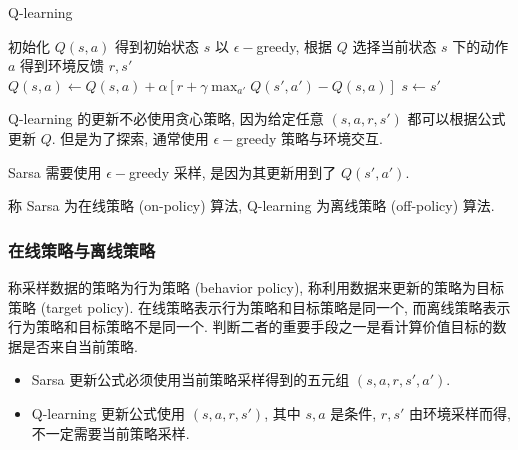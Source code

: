\begin{algorithm}[htb]
    \caption{Q-learning}
    \begin{algorithmic}
        \State 初始化 $Q(s,a)$
            \State 得到初始状态 $s$
                \State 以 $\epsilon-$greedy, 根据 $Q$ 选择当前状态 $s$ 下的动作 $a$
                \State 得到环境反馈 $r, s'$
                \State $\displaystyle Q(s, a) \leftarrow Q(s, a) + \alpha \left[ r + \gamma \max_{a'} Q(s', a') - Q(s, a) \right]$
                \State $s\leftarrow s'$
            \EndFor
        \EndFor
    \end{algorithmic}
\end{algorithm}


Q-learning 的更新不必使用贪心策略, 因为给定任意 $(s,a,r,s')$ 都可以根据公式更新 $Q$. 但是为了探索, 通常使用 $\epsilon-$greedy 策略与环境交互. 

Sarsa 需要使用 $\epsilon-$greedy 采样, 是因为其更新用到了 $Q(s',a')$.

称 Sarsa 为在线策略 (on-policy) 算法, Q-learning 为离线策略 (off-policy) 算法. 


\subsubsection{在线策略与离线策略}
称采样数据的策略为行为策略 (behavior policy), 称利用数据来更新的策略为目标策略 (target policy). 在线策略表示行为策略和目标策略是同一个, 而离线策略表示行为策略和目标策略不是同一个. 判断二者的重要手段之一是看计算价值目标的数据是否来自当前策略. 

\begin{itemize}
    \item Sarsa 更新公式必须使用当前策略采样得到的五元组 $(s,a,r,s',a')$.
    \item Q-learning 更新公式使用 $(s,a,r,s')$, 其中 $s,a$ 是条件, $r,s'$ 由环境采样而得, 不一定需要当前策略采样. 
\end{itemize}


